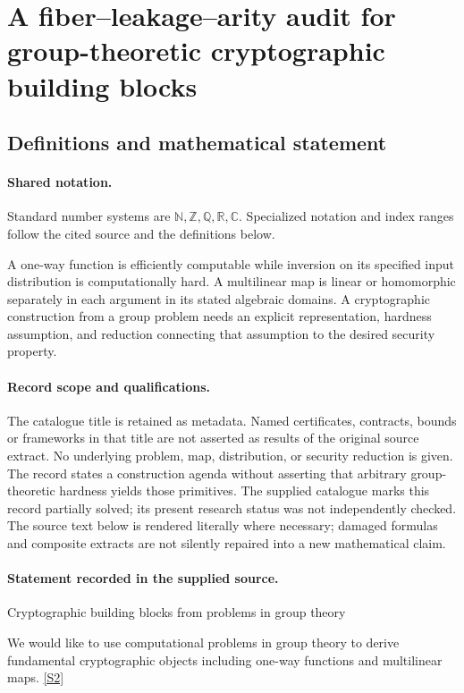 \documentclass[11pt]{article}
\newcommand{\sref}[2]{\hyperlink{source:#1:#2}{[S#2]}}
\begin{document}
\section{A fiber--leakage--arity audit for group-theoretic cryptographic building blocks}\label{statement}

\subsection{Definitions and mathematical statement}

\paragraph{Shared notation.}Standard number systems are $\mathbb N,\mathbb Z,\mathbb Q,\mathbb R,\mathbb C$. Specialized notation and index ranges follow the cited source and the definitions below.


A one-way function is efficiently computable while inversion on its specified input distribution is computationally hard. A multilinear map is linear or homomorphic separately in each argument in its stated algebraic domains. A cryptographic construction from a group problem needs an explicit representation, hardness assumption, and reduction connecting that assumption to the desired security property.
\paragraph{Record scope and qualifications.}
The catalogue title is retained as metadata. Named certificates, contracts, bounds or frameworks in that title are not asserted as results of the original source extract.
No underlying problem, map, distribution, or security reduction is given. The record states a construction agenda without asserting that arbitrary group-theoretic hardness yields those primitives. The supplied catalogue marks this record partially solved; its present research status was not independently checked.
The source text below is rendered literally where necessary; damaged formulas and composite extracts are not silently repaired into a new mathematical claim.
\paragraph{Statement recorded in the supplied source.}
Cryptographic building blocks from problems in group theory

We would like to use computational problems in group theory to derive fundamental cryptographic objects including one-way functions and multilinear maps. \sref{statement}{2}
\end{document}

